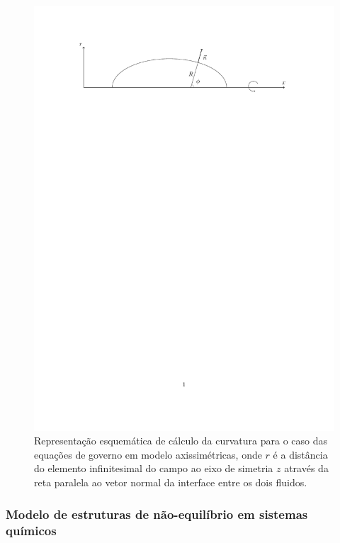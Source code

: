 \documentclass[a4paper,portuges,12pt]{article}
\begin{document}
 \begin{figure}[h!]
 	\begin{center}
 		\includegraphics[angle=0, scale=0.5]{figs/axisymmetric.pdf}
 	\end{center}
	\caption{Representação esquemática de cálculo da curvatura para o
	caso das equações de governo em modelo axissimétricas, onde $r$ é a
	distância do elemento infinitesimal do campo ao eixo de simetria $z$
	através da reta paralela ao vetor normal da interface entre os dois
	fluidos. }
 	\label{fig:axisymmetric} 
 \end{figure}

\subsubsection{Modelo de estruturas de não-equilíbrio em sistemas
químicos}
\label{sec:chem}
\end{document}
